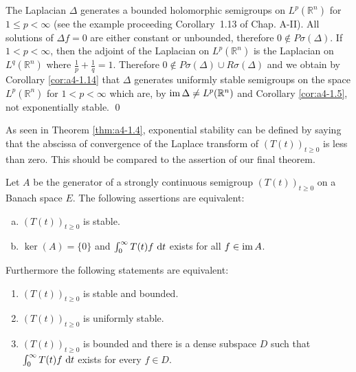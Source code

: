 \begin{example}\label{ex:a4-15}
The Laplacian $\Delta$ generates a bounded holomorphic semigroups on $L^{p}(\mathbb{R}^{n})$ for $1 \leq p < \infty$ (see the example proceeding
Corollary~1.13 of Chap. A-II). 
All solutions of $\Delta f = 0$ are either constant
or unbounded, therefore $0 \not\in P\sigma(\Delta)$. 
If $1 < p < \infty$, then the adjoint
of the Laplacian on $L^{p}(\mathbb{R}^{n})$ is the Laplacian on $L^{q}(\mathbb{R}^{n})$ where
$\frac{1}{p} + \frac{1}{q} = 1$. 
Therefore $0 \not\in P\sigma(\Delta) \cup R\sigma(\Delta)$ and we obtain by Corollary \ref{cor:a4-1.14}
that $\Delta$ generates uniformly stable semigroups on the space $L^{p}(\mathbb{R}^{n})$
for $1 < p < \infty$ which are, by $\mathop{}\!\mathrm{im}\, \Delta \not= L^{p}(\mathbb{R}^{n})$ and Corollary \ref{cor:a4-1.5}, not exponentially stable. \qed
\end{example}

As seen in Theorem \ref{thm:a4-1.4}, exponential stability can be defined by saying that the abscissa of convergence of the Laplace transform of $(T(t))_{t \geq 0}$ is less than zero. 
This should be compared to the assertion of our final theorem.

\begin{theorem}\label{thm:a4-1.16}
Let $A$ be the generator of a strongly continuous semigroup $(T(t))_{t \geq 0}$ on a Banach space $E$. 
The following assertions are equivalent:
\begin{enumerate}[(a)]
\item $(T(t))_{t \geq 0}$ is stable.
\item $\ker(A) = \{0\}$ and $\int_{0}^{\infty} T(t)f \,\mathop{}\!\mathrm{d}{t}$ exists for all $f \in \mathop{}\!\mathrm{im}\, A$.
\end{enumerate}
Furthermore the following statements are equivalent:
\begin{enumerate}[(a$'$)]
\item $(T(t))_{t \geq 0}$ is stable and bounded.
\item $(T(t))_{t \geq 0}$ is uniformly stable.
\item $(T(t))_{t \geq 0}$ is bounded and there is a dense subspace $D$ such that $\int_{0}^{\infty} T(t)f \,\mathop{}\!\mathrm{d}{t}$ exists for every $f \in D$.
\end{enumerate}
\end{theorem}

